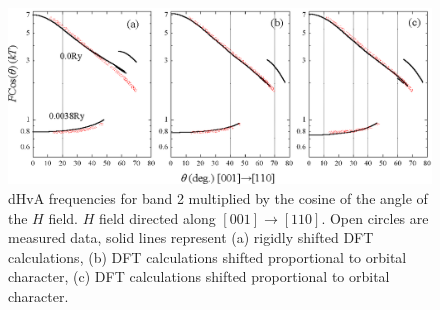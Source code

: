 \begin{figure}[htbp]
    \begin{center}
        \includegraphics[scale=0.8]{Chapter-dHvABaFe2P2/Figures/AngleDepMeasurements/BandCharacterRotPlot/Band2_110_RotPlot_Comparison}
        \caption{dHvA frequencies for band 2 multiplied by the cosine of the angle of the $H$ field. $H$ field directed along $[001]\rightarrow[110]$. Open circles are measured data, solid lines represent (a) rigidly shifted \ac{DFT} calculations, (b) \ac{DFT} calculations shifted proportional to \DzTwo orbital character, (c) \ac{DFT} calculations shifted proportional to \DxzDyz orbital character.}
        \label{Fig:ResD:Band2DCharacterRigidComparison}
    \end{center}
\end{figure}

